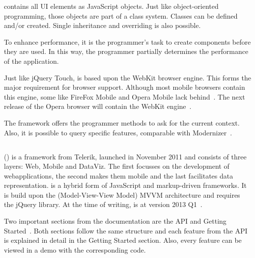 \documentclass[a4paper]{artikel3}
\newcommand{\setspace}[0]{\vspace{2mm}}
\renewcommand{\paragraph}[1]{\setspace \noindent {\bf #1}  }
\begin{document}
\sta{} contains all UI elements as JavaScript objects.  
Just like object-oriented programming,  those objects are part of a class system.  
Classes can be defined and/or created.  
Single inheritance and overriding is also possible.    

To enhance performance,  it is the programmer's task to create components before they are used.  
In this way,  the programmer partially determines the performance of the application.

\paragraph{Browser support}
Just like jQuery Touch,  \sta{} is based upon the WebKit browser engine.  
This forms the major requirement for browser support.  
Although most mobile browsers contain this engine,  some like FireFox Mobile and Opera Mobile lack behind~\cite{JohnEClark2012}.  
The next release of the Opera browser will contain the WebKit engine~\cite{Wokke2013}.

The framework offers the programmer methods to ask for the current context.
Also,  it is possible to query specific features,  comparable with Modernizer~\cite{Modernizr2012}.  


\subsection{\kendo} %
\label{sec:frameworks-kendo}

\kendo{} (\kendoa{}) is a framework from Telerik,  launched in November 2011 and consists of three layers:  Web,  Mobile and DataViz.
The first focusses on the development of webapplications,  the second makes them mobile and the last facilitates data representation.
\kendoa{} is a hybrid form of JavaScript and markup-driven frameworks.
It is build upon the (Model-View-View Model) MVVM architecture and requires the jQuery library.
At the time of writing,  \kendoa{} is at version 2013 Q1~\cite{Telerike}. 

\paragraph{Documentation}
Two important sections from the documentation are the API and Getting Started~\cite{Telerikd}.
Both sections follow the same structure and each feature from the API is explained in detail in the Getting Started section.
Also,  every feature can be viewed in a demo with the corresponding code.
\end{document}
